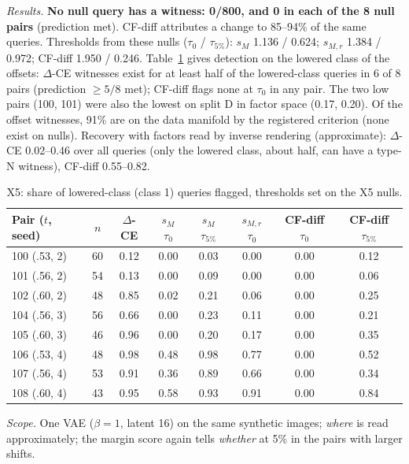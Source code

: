 \documentclass[10pt,a4paper]{article}
\theoremstyle{remark}
\newcommand{\DCE}{$\Delta$-CE}
\begin{document}
\emph{Results.} \textbf{No null query has a witness: 0/800, and 0 in each of the 8 null pairs} (prediction met). CF-diff attributes a change to 85--94\% of the same queries. Thresholds from these nulls ($\tau_0$ / $\tau_{5\%}$): $s_M$ 1.136 / 0.624; $s_{M,r}$ 1.384 / 0.972; CF-diff 1.950 / 0.246. Table~\ref{tab:x5} gives detection on the lowered class of the offsets: \DCE{} witnesses exist for at least half of the lowered-class queries in 6 of 8 pairs (prediction $\ge5/8$ met); CF-diff flags none at $\tau_0$ in any pair. The two low pairs (100, 101) were also the lowest on split D in factor space (0.17, 0.20). Of the offset witnesses, 91\% are on the data manifold by the registered criterion (none exist on nulls). Recovery with factors read by inverse rendering (approximate): \DCE{} 0.02--0.46 over all queries (only the lowered class, about half, can have a type-N witness), CF-diff 0.55--0.82.

\begin{table}[h]
\centering\small
\caption{X5: share of lowered-class (class 1) queries flagged, thresholds set on the X5 nulls.}\label{tab:x5}
\begin{tabular}{lccccccc}
\toprule
Pair ($t$, seed) & $n$ & \DCE & $s_M$ $\tau_0$ & $s_M$ $\tau_{5\%}$ & $s_{M,r}$ $\tau_0$ & CF-diff $\tau_0$ & CF-diff $\tau_{5\%}$\\
\midrule
100 (.53, 2) & 60 & 0.12 & 0.00 & 0.03 & 0.00 & 0.00 & 0.12\\
101 (.56, 2) & 54 & 0.13 & 0.00 & 0.09 & 0.00 & 0.00 & 0.06\\
102 (.60, 2) & 48 & 0.85 & 0.02 & 0.21 & 0.06 & 0.00 & 0.25\\
104 (.56, 3) & 56 & 0.66 & 0.00 & 0.23 & 0.11 & 0.00 & 0.21\\
105 (.60, 3) & 46 & 0.96 & 0.00 & 0.20 & 0.17 & 0.00 & 0.35\\
106 (.53, 4) & 48 & 0.98 & 0.48 & 0.98 & 0.77 & 0.00 & 0.52\\
107 (.56, 4) & 53 & 0.91 & 0.36 & 0.89 & 0.66 & 0.00 & 0.34\\
108 (.60, 4) & 43 & 0.95 & 0.58 & 0.93 & 0.91 & 0.00 & 0.84\\
\bottomrule
\end{tabular}
\end{table}

\emph{Scope.} One VAE ($\beta=1$, latent 16) on the same synthetic images; \emph{where} is read approximately; the margin score again tells \emph{whether} at 5\% in the pairs with larger shifts.
\end{document}

